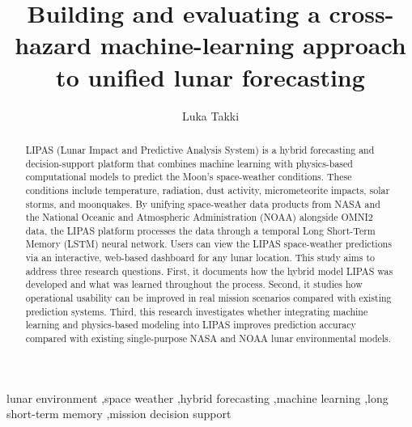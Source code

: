 \documentclass[12pt]{elsarticle}
\begin{document}
\begin{frontmatter}

\title{Building and evaluating a cross-hazard machine-learning approach to unified lunar forecasting}

\author[aff1]{Luka Takki}
\address[aff1]{Affiliation and full postal address required before submission}

\begin{abstract}
LIPAS (Lunar Impact and Predictive Analysis System) is a hybrid forecasting and decision-support platform that combines machine
learning with physics-based computational models to predict the Moon's space-weather conditions. These conditions include
temperature, radiation, dust activity, micrometeorite impacts, solar storms, and moonquakes. By unifying space-weather data
products from NASA and the National Oceanic and Atmospheric Administration (NOAA) alongside OMNI2 data, the LIPAS
platform processes the data through a temporal Long Short-Term Memory (LSTM) neural network. Users can view the LIPAS
space-weather predictions via an interactive, web-based dashboard for any lunar location.
This study aims to address three research questions. First, it documents how the hybrid model LIPAS was developed and what
was learned throughout the process. Second, it studies how operational usability can be improved in real mission scenarios compared
with existing prediction systems. Third, this research investigates whether integrating machine learning and physics-based modeling
into LIPAS improves prediction accuracy compared with existing single-purpose NASA and NOAA lunar environmental models.
\end{abstract}

\begin{keyword}
lunar environment \sep space weather \sep hybrid forecasting \sep machine learning \sep long short-term memory \sep mission decision support
\end{keyword}

\end{frontmatter}










{\sloppy


}
\end{document}
